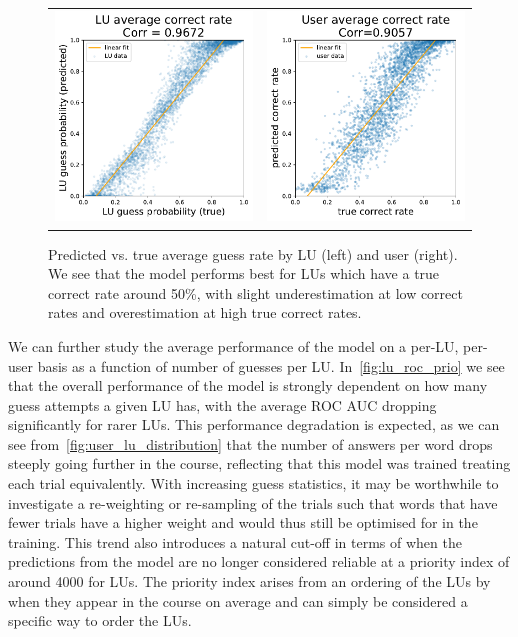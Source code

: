 \begin{figure}[ht]
\centering
\begin{tabular}{cc}
\includegraphics[width=0.4\linewidth]{figures/lingvist/lu_correct_rate.pdf} &
\includegraphics[width=0.4\linewidth]{figures/lingvist/user_correct_rate.pdf} \\
\end{tabular}
\caption[Predicted vs. true average guess rate]{Predicted vs. true average guess rate by LU (left) and user (right). We see that the model performs best for LUs which have a true correct rate around 50\%, with slight underestimation at low correct rates and overestimation at high true correct rates.}
\label{fig:user_lu_correct_rate}
\end{figure}

We can further study the average performance of the model on a per-LU, per-user basis as a function of number of guesses per LU. In~\cref{fig:lu_roc_prio} we see that the overall performance of the model is strongly dependent on how many guess attempts a given LU has, with the average ROC AUC dropping significantly for rarer LUs. This performance degradation is expected, as we can see from~\cref{fig:user_lu_distribution} that the number of answers per word drops steeply going further in the course, reflecting that this model was trained treating each trial equivalently. With increasing guess statistics, it may be worthwhile to investigate a re-weighting or re-sampling of the trials such that words that have fewer trials have a higher weight and would thus still be optimised for in the training. This trend also introduces a natural cut-off in terms of when the predictions from the model are no longer considered reliable at a priority index of around 4000 for LUs. The priority index arises from an ordering of the LUs by when they appear in the course on average and can simply be considered a specific way to order the LUs.

